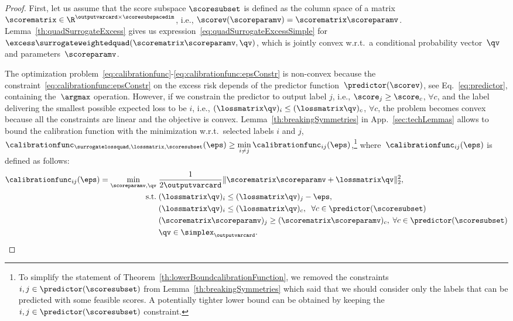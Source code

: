 \documentclass{article}
\begin{document}
\begin{proof}
    First, let us assume that the score subspace $\scoresubset$ is defined as the column space of a matrix~$\scorematrix \in \R^{\outputvarcard \times \scoresubspacedim}$, i.e., $\scorev(\scoreparamv)=\scorematrix\scoreparamv$.
    Lemma~\ref{th:quadSurrogateExcess} gives us expression~\eqref{eq:quadSurrogateExcessSimple} for~$\excess\surrogateweightedquad(\scorematrix\scoreparamv, \qv)$, which is jointly convex w.r.t.\ a conditional probability vector~$\qv$ and parameters~$\scoreparamv$.
    
    The optimization problem~\eqref{eq:calibrationfunc}-\eqref{eq:calibrationfunc:epsConstr} is non-convex because the constraint~\eqref{eq:calibrationfunc:epsConstr} on the excess risk depends of the predictor function~$\predictor(\scorev)$, see Eq.~\eqref{eq:predictor}, containing the~$\argmax$ operation.
    However, if we constrain the predictor to output label $j$, i.e., $\score_j \geq \score_c$, $\forall c$, and the label delivering the smallest possible expected loss to be $i$, i.e., $(\lossmatrix \qv)_i \leq (\lossmatrix \qv)_c$, $\forall c$, the problem becomes convex because all the constraints are linear and the objective is convex.
     Lemma~\ref{th:breakingSymmetries} in App.~\ref{sec:techLemmas} allows to bound the calibration function with the minimization w.r.t.\ selected labels $i$ and $j$, $\calibrationfunc_{\surrogatelossquad,\lossmatrix,\scoresubset}(\eps) \geq \min\limits_{i \neq j} \calibrationfunc_{ij}(\eps)$,\footnote{To simplify the statement of Theorem~\ref{th:lowerBoundcalibrationFunction}, we removed the constraints~$i,j \in \predictor(\scoresubset)$ from Lemma~\ref{th:breakingSymmetries} which said that we should consider only the labels that can be predicted with some feasible scores. A potentially tighter lower bound can be obtained by keeping the~$i,j \in \predictor(\scoresubset)$ constraint.} where~$\calibrationfunc_{ij}(\eps)$ is defined as follows:
    \begin{align}
    \label{eq:calibrationfunc:breakingSymmetries}
    \calibrationfunc_{ij}(\eps)
    =
    \min_{\scoreparamv, \qv} \;& \frac{1}{2 \outputvarcard}\|\scorematrix \scoreparamv + \lossmatrix \qv\|_2^2, \\
    \notag %
    \text{s.t.} \;& (\lossmatrix \qv)_i \leq (\lossmatrix \qv)_j - \eps,\\
    \notag %
    &(\lossmatrix \qv)_i \leq (\lossmatrix \qv)_c,\;\; \forall c \in \predictor(\scoresubset) \\
    \notag %
    &(\scorematrix \scoreparamv)_j \geq (\scorematrix \scoreparamv)_c,\; \forall c \in \predictor(\scoresubset) \\
    \notag %
    & \qv \in \simplex_\outputvarcard.
    \end{align}
    

\end{proof}
\end{document}
